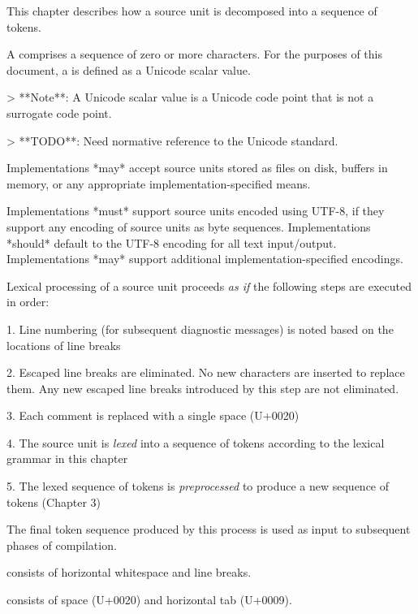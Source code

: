 
This chapter describes how a source unit is decomposed into a sequence of tokens.


A  comprises a sequence of zero or more characters.
For the purposes of this document, a  is defined as a Unicode scalar value.

> **Note**: A Unicode scalar value is a Unicode code point that is not a surrogate code point.

> **TODO**: Need normative reference to the Unicode standard.

Implementations *may* accept source units stored as files on disk, buffers in memory, or any appropriate implementation-specified means.


Implementations *must* support source units encoded using UTF-8, if they support any encoding of source units as byte sequences.
Implementations *should* default to the UTF-8 encoding for all text input/output.
Implementations *may* support additional implementation-specified encodings.


Lexical processing of a source unit proceeds \emph{as if} the following steps are executed in order:

1. Line numbering (for subsequent diagnostic messages) is noted based on the locations of line breaks

2. Escaped line breaks are eliminated. No new characters are inserted to replace them. Any new escaped line breaks introduced by this step are not eliminated.

3. Each comment is replaced with a single space (U+0020)

4. The source unit is \emph{lexed} into a sequence of tokens according to the lexical grammar in this chapter

5. The lexed sequence of tokens is \emph{preprocessed} to produce a new sequence of tokens (Chapter 3)

The final token sequence produced by this process is used as input to subsequent phases of compilation.


 consists of horizontal whitespace and line breaks.

 consists of space (U+0020) and horizontal tab (U+0009).

